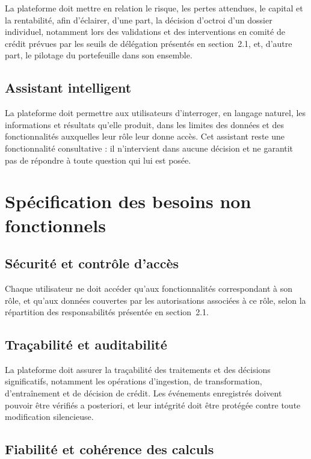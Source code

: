 La plateforme doit mettre en relation le risque, les pertes attendues, le capital et la rentabilité, afin d'éclairer, d'une part, la décision d'octroi d'un dossier individuel, notamment lors des validations et des interventions en comité de crédit prévues par les seuils de délégation présentés en section~2.1, et, d'autre part, le pilotage du portefeuille dans son ensemble.

\subsection{Assistant intelligent}

La plateforme doit permettre aux utilisateurs d'interroger, en langage naturel, les informations et résultats qu'elle produit, dans les limites des données et des fonctionnalités auxquelles leur rôle leur donne accès. Cet assistant reste une fonctionnalité consultative : il n'intervient dans aucune décision et ne garantit pas de répondre à toute question qui lui est posée.

\section{Spécification des besoins non fonctionnels}

\subsection{Sécurité et contrôle d'accès}

Chaque utilisateur ne doit accéder qu'aux fonctionnalités correspondant à son rôle, et qu'aux données couvertes par les autorisations associées à ce rôle, selon la répartition des responsabilités présentée en section~2.1.

\subsection{Traçabilité et auditabilité}

La plateforme doit assurer la traçabilité des traitements et des décisions significatifs, notamment les opérations d'ingestion, de transformation, d'entraînement et de décision de crédit. Les événements enregistrés doivent pouvoir être vérifiés a posteriori, et leur intégrité doit être protégée contre toute modification silencieuse.

\subsection{Fiabilité et cohérence des calculs}

